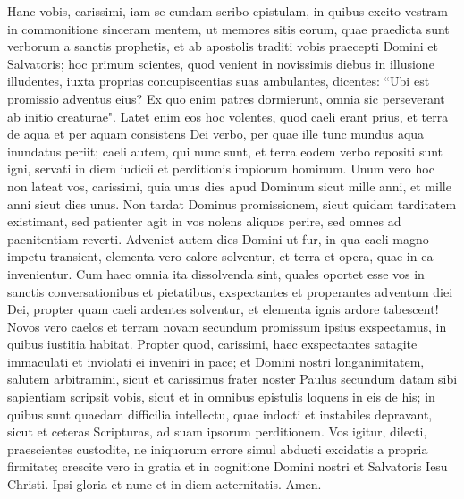 \begin{biblechapter} 
\verse Hanc vobis, carissimi, iam se cundam scribo epistulam, in quibus excito vestram in commonitione sinceram mentem, 
\verse ut memores sitis eorum, quae praedicta sunt verborum a sanctis prophetis, et ab apostolis traditi vobis praecepti Domini et Salvatoris; 
\verse hoc primum scientes, quod venient in novissimis diebus in illusione illudentes, iuxta proprias concupiscentias suas ambulantes, 
\verse dicentes: “Ubi est promissio adventus eius? Ex quo enim patres dormierunt, omnia sic perseverant ab initio creaturae". 
\verse Latet enim eos hoc volentes, quod caeli erant prius, et terra de aqua et per aquam consistens Dei verbo, 
\verse per quae ille tunc mundus aqua inundatus periit; 
\verse caeli autem, qui nunc sunt, et terra eodem verbo repositi sunt igni, servati in diem iudicii et perditionis impiorum hominum. 
\verse Unum vero hoc non lateat vos, carissimi, quia unus dies apud Dominum sicut mille anni, et mille anni sicut dies unus. 
\verse Non tardat Dominus promissionem, sicut quidam tarditatem existimant, sed patienter agit in vos nolens aliquos perire, sed omnes ad paenitentiam reverti. 
\verse Adveniet autem dies Domini ut fur, in qua caeli magno impetu transient, elementa vero calore solventur, et terra et opera, quae in ea invenientur. 
\verse Cum haec omnia ita dissolvenda sint, quales oportet esse vos in sanctis conversationibus et pietatibus, 
\verse exspectantes et properantes adventum diei Dei, propter quam caeli ardentes solventur, et elementa ignis ardore tabescent! 
\verse Novos vero caelos et terram novam secundum promissum ipsius exspectamus, in quibus iustitia habitat. 
\verse Propter quod, carissimi, haec exspectantes satagite immaculati et inviolati ei inveniri in pace; 
\verse et Domini nostri longanimitatem, salutem arbitramini, sicut et carissimus frater noster Paulus secundum datam sibi sapientiam scripsit vobis, 
\verse sicut et in omnibus epistulis loquens in eis de his; in quibus sunt quaedam difficilia intellectu, quae indocti et instabiles depravant, sicut et ceteras Scripturas, ad suam ipsorum perditionem. 
\verse Vos igitur, dilecti, praescientes custodite, ne iniquorum errore simul abducti excidatis a propria firmitate; 
\verse crescite vero in gratia et in cognitione Domini nostri et Salvatoris Iesu Christi. Ipsi gloria et nunc et in diem aeternitatis. Amen.
\end{biblechapter}
